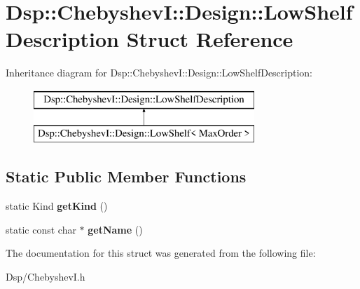 \hypertarget{structDsp_1_1ChebyshevI_1_1Design_1_1LowShelfDescription}{\section{Dsp\-:\-:Chebyshev\-I\-:\-:Design\-:\-:Low\-Shelf\-Description Struct Reference}
\label{structDsp_1_1ChebyshevI_1_1Design_1_1LowShelfDescription}
}
Inheritance diagram for Dsp\-:\-:Chebyshev\-I\-:\-:Design\-:\-:Low\-Shelf\-Description\-:\begin{figure}[H]
\begin{center}
\leavevmode
\includegraphics[height=2.000000cm]{structDsp_1_1ChebyshevI_1_1Design_1_1LowShelfDescription}
\end{center}
\end{figure}
\subsection*{Static Public Member Functions}
\begin{DoxyCompactItemize}
\item 
\hypertarget{structDsp_1_1ChebyshevI_1_1Design_1_1LowShelfDescription_ad5ed40bd0d72480b80055d8b5f97320e}{static Kind {\bfseries get\-Kind} ()}\label{structDsp_1_1ChebyshevI_1_1Design_1_1LowShelfDescription_ad5ed40bd0d72480b80055d8b5f97320e}

\item 
\hypertarget{structDsp_1_1ChebyshevI_1_1Design_1_1LowShelfDescription_a54e2a4b8235af34f7fcdda85a0f5a8a1}{static const char $\ast$ {\bfseries get\-Name} ()}\label{structDsp_1_1ChebyshevI_1_1Design_1_1LowShelfDescription_a54e2a4b8235af34f7fcdda85a0f5a8a1}

\end{DoxyCompactItemize}


The documentation for this struct was generated from the following file\-:\begin{DoxyCompactItemize}
\item 
Dsp/Chebyshev\-I.\-h\end{DoxyCompactItemize}

